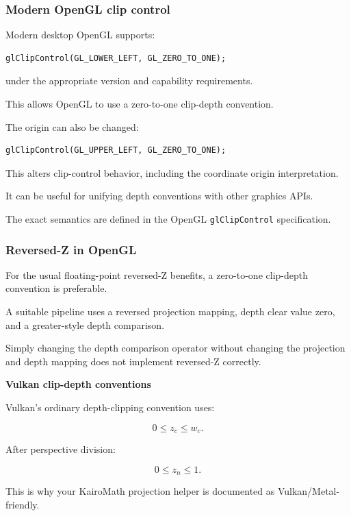 \subsubsection{Modern OpenGL clip control}\label{modern-opengl-clip-control}

Modern desktop OpenGL supports:

\begin{verbatim}
glClipControl(GL_LOWER_LEFT, GL_ZERO_TO_ONE);
\end{verbatim}

under the appropriate version and capability requirements.

This allows OpenGL to use a zero-to-one clip-depth convention.

The origin can also be changed:

\begin{verbatim}
glClipControl(GL_UPPER_LEFT, GL_ZERO_TO_ONE);
\end{verbatim}

This alters clip-control behavior, including the coordinate origin interpretation.

It can be useful for unifying depth conventions with other graphics APIs.

The exact semantics are defined in the OpenGL \texttt{glClipControl} specification. 

\subsubsection{Reversed-Z in OpenGL}\label{reversed-z-in-opengl}

For the usual floating-point reversed-Z benefits, a zero-to-one clip-depth convention is preferable.

A suitable pipeline uses a reversed projection mapping, depth clear value zero, and a greater-style depth comparison.

Simply changing the depth comparison operator without changing the projection and depth mapping does not implement reversed-Z correctly.

\textbf{Vulkan clip-depth conventions}

Vulkan's ordinary depth-clipping convention uses:

\[
 \boxed{ 0\le z_c\le w_c }.
\]

After perspective division:

\[
 \boxed{ 0\le z_n\le1 }.
\]

This is why your KairoMath projection helper is documented as Vulkan/Metal-friendly.


